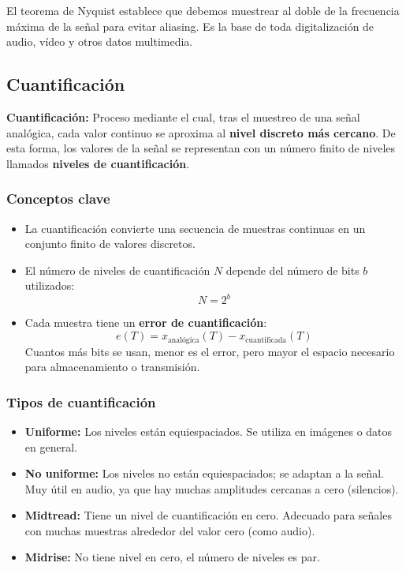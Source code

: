 \documentclass[11pt,a4paper]{article}
\begin{document}
\begin{ResumenBox}
El teorema de Nyquist establece que debemos muestrear al doble de la frecuencia máxima de la señal para evitar aliasing.
Es la base de toda digitalización de audio, vídeo y otros datos multimedia.
\end{ResumenBox}

\subsection{Cuantificación}

\begin{DefBox}
\textbf{Cuantificación:}
Proceso mediante el cual, tras el muestreo de una señal analógica, cada valor continuo se aproxima al \textbf{nivel discreto más cercano}.
De esta forma, los valores de la señal se representan con un número finito de niveles llamados \textbf{niveles de cuantificación}.
\end{DefBox}

\subsubsection*{Conceptos clave}
\begin{itemize}
  \item La cuantificación convierte una secuencia de muestras continuas en un conjunto finito de valores discretos.
  \item El número de niveles de cuantificación $N$ depende del número de bits $b$ utilizados:
  \begin{equation*}
  N = 2^b
  \end{equation*}
  \item Cada muestra tiene un \textbf{error de cuantificación}:
  \begin{equation*}
  e(T) = x_{\text{analógica}}(T) - x_{\text{cuantificada}}(T)
  \end{equation*}
  Cuantos más bits se usan, menor es el error, pero mayor el espacio necesario para almacenamiento o transmisión.
\end{itemize}

\subsubsection*{Tipos de cuantificación}
\begin{itemize}
  \item \textbf{Uniforme:} Los niveles están equiespaciados.
  Se utiliza en imágenes o datos en general.
  \item \textbf{No uniforme:} Los niveles no están equiespaciados; se adaptan a la señal.
  Muy útil en audio, ya que hay muchas amplitudes cercanas a cero (silencios).
  \item \textbf{Midtread:} Tiene un nivel de cuantificación en cero.
  Adecuado para señales con muchas muestras alrededor del valor cero (como audio).
  \item \textbf{Midrise:} No tiene nivel en cero, el número de niveles es par.
\end{itemize}
\end{document}
